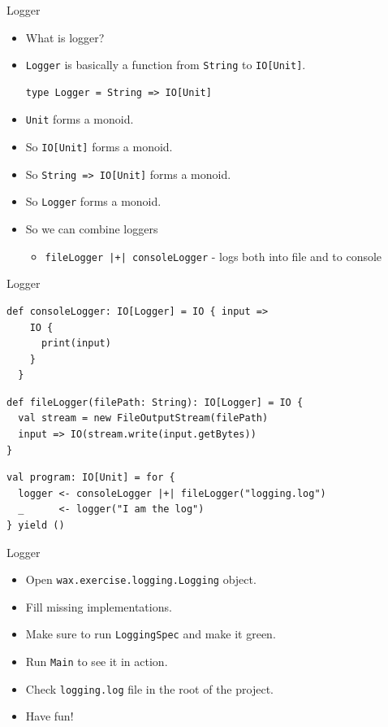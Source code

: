 \documentclass[presentation,aspectratio=169,smaller]{beamer}
\begin{document}
\begin{frame}[label={sec:org82aed67},fragile]{Logger}
 \begin{itemize}
\item <1-> What is logger?
\item <2-> \texttt{Logger} is basically a function from \texttt{String} to \texttt{IO[Unit]}.
\begin{verbatim}
type Logger = String => IO[Unit]
\end{verbatim}
\item <3-> \texttt{Unit} forms a monoid.
\item <4-> So \texttt{IO[Unit]} forms a monoid.
\item <5-> So \texttt{String => IO[Unit]} forms a monoid.
\item <6-> So \texttt{Logger} forms a monoid.
\item <7-> So we can combine loggers
\begin{itemize}
\item \texttt{fileLogger |+| consoleLogger} - logs both into file and to console
\end{itemize}
\end{itemize}
\end{frame}

\begin{frame}[label={sec:orgb80f1fd},fragile]{Logger}
 \begin{verbatim}
def consoleLogger: IO[Logger] = IO { input =>
    IO {
      print(input)
    }
  }
\end{verbatim}

\pause

\begin{verbatim}
def fileLogger(filePath: String): IO[Logger] = IO {
  val stream = new FileOutputStream(filePath)
  input => IO(stream.write(input.getBytes))
}
\end{verbatim}

\pause

\begin{verbatim}
val program: IO[Unit] = for {
  logger <- consoleLogger |+| fileLogger("logging.log")
  _      <- logger("I am the log")
} yield ()
\end{verbatim}
\end{frame}

\begin{frame}[label={sec:orgdd9ee3a},fragile]{Logger}
 \begin{itemize}
\item <1-> Open \texttt{wax.exercise.logging.Logging} object.
\item <2-> Fill missing implementations.
\item <3-> Make sure to run \texttt{LoggingSpec} and make it green.
\item <4-> Run \texttt{Main} to see it in action.
\item <5-> Check \texttt{logging.log} file in the root of the project.
\item <6-> Have fun!
\end{itemize}
\end{frame}
\end{document}
